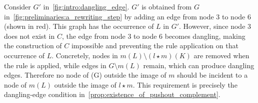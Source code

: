 Consider $G'$ in~\autoref{fig:intro:dangling_edge}. $G'$ is obtained from $G$ in~\autoref{fig:preliminaries:a_rewriting_step} by adding an edge from node $3$ to node $6$ (shown in red). This graph has the occurrence  of $L$ in $G'$. However, since node $3$ does not exist in $C$, the edge from node $3$ to node $6$ becomes dangling, making the construction of $C$ impossible and preventing the rule application on that occurrence of $L$. Concretely, nodes in \(m(L)\setminus (l\star m)(K)\) are removed when the rule is applied, while edges in \(G\setminus m(L)\) remain, which can produce dangling edges. Therefore no node of (G) outside the image of \(m\) should be incident to a node of \(m(L)\) outside the image of \(l\star m\). This requirement is precisely the dangling-edge condition in~\autoref{prop:existence_of_pushout_complement}.

